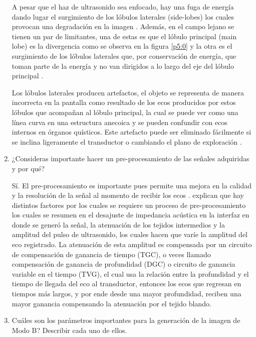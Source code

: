 \begin{enumerate}
\begin{adjustbox}{valign=T,raise=\strutheight,minipage={\linewidth}}
A pesar que el haz de ultrasonido sea enfocado, hay una fuga de energía dando lugar el surgimiento de los lóbulos laterales (side-lobes) los cuales provocan una degradación en la imagen \citep{kun}. Además, en el campo lejano se tienen un par de limitantes, una de estas es que el lóbulo principal (main lobe) es la divergencia como se observa en la figura \ref{p5:0} y la otra es el surgimiento de los lóbulos laterales que, por conservación de energía, que toman parte de la energía y no van dirigidos a lo largo del eje del lóbulo principal \citep{matthew}.



\end{adjustbox}

Los lóbulos laterales producen artefactos, el objeto se representa de manera incorrecta en la pantalla como resultado de los ecos producidos por estos lóbulos que acompañan al lóbulo principal, la cual se puede ver como una línea curva en una estructura anecoica y se pueden confundir con ecos internos en órganos quísticos. Este artefacto puede ser eliminado fácilmente si se inclina ligeramente el transductor o cambiando el plano de exploración \citep{thieme}.


  


  \item ¿Consideras importante hacer un pre-procesamiento de las señales adquiridas y por qué?
  
Sí. El pre-procesamiento es importante pues permite una mejora en la calidad y la resolución de la señal al momento de recibir los ecos \citep{thieme}. \citet{russ} explican que hay distintos factores por los cuales se requiere un proceso de pre-procesamiento los cuales se resumen en el desajuste de impedancia acústica en la interfaz en donde se generó la señal, la atenuación de los tejidos intermedios y la amplitud del pulso de ultrasonido, los cuales hacen que varíe la amplitud del eco registrado. La atenuación de esta amplitud es compensada por un circuito de compensación de ganancia de tiempo (TGC), o veces llamado compensación de ganancia de profundidad (DGC) o circuito de ganancia variable en el tiempo (TVG), el cual usa la relación entre la profundidad y el tiempo de llegada del eco al transductor, entonces los ecos que regresan en tiempos más largos, y por ende desde una mayor profundidad, reciben una mayor ganancia compensando la atenuación por el tejido blando.

  \item Cuáles son los parámetros importantes para la generación de la imagen de Modo B? Describir cada uno de ellos.
  

\end{enumerate}
